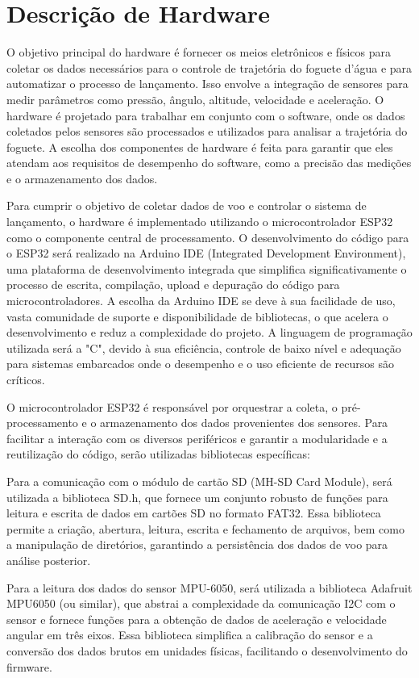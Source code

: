 \section{Descrição de Hardware}
O objetivo principal do hardware é fornecer os meios eletrônicos e físicos para coletar os dados necessários para o controle de trajetória do foguete d'água e para automatizar o processo de lançamento. Isso envolve a integração de sensores para medir parâmetros como pressão, ângulo, altitude, velocidade e aceleração. O hardware é projetado para trabalhar em conjunto com o software, onde os dados coletados pelos sensores são processados e utilizados para analisar a trajetória do foguete. A escolha dos componentes de hardware é feita para garantir que eles atendam aos requisitos de desempenho do software, como a precisão das medições e o armazenamento dos dados.

Para cumprir o objetivo de coletar dados de voo e controlar o sistema de lançamento, o hardware é implementado utilizando o microcontrolador ESP32 como o componente central de processamento. O desenvolvimento do código para o ESP32 será realizado na Arduino IDE (Integrated Development Environment), uma plataforma de desenvolvimento integrada que simplifica significativamente o processo de escrita, compilação, upload e depuração do código para microcontroladores. A escolha da Arduino IDE se deve à sua facilidade de uso, vasta comunidade de suporte e disponibilidade de bibliotecas, o que acelera o desenvolvimento e reduz a complexidade do projeto. A linguagem de programação utilizada será a "C", devido à sua eficiência, controle de baixo nível e adequação para sistemas embarcados onde o desempenho e o uso eficiente de recursos são críticos.

O microcontrolador ESP32 é responsável por orquestrar a coleta, o pré-processamento e o armazenamento dos dados provenientes dos sensores. Para facilitar a interação com os diversos periféricos e garantir a modularidade e a reutilização do código, serão utilizadas bibliotecas específicas:

Para a comunicação com o módulo de cartão SD (MH-SD Card Module), será utilizada a biblioteca SD.h, que fornece um conjunto robusto de funções para leitura e escrita de dados em cartões SD no formato FAT32. Essa biblioteca permite a criação, abertura, leitura, escrita e fechamento de arquivos, bem como a manipulação de diretórios, garantindo a persistência dos dados de voo para análise posterior.

Para a leitura dos dados do sensor MPU-6050, será utilizada a biblioteca Adafruit MPU6050 (ou similar), que abstrai a complexidade da comunicação I2C com o sensor e fornece funções para a obtenção de dados de aceleração e velocidade angular em três eixos. Essa biblioteca simplifica a calibração do sensor e a conversão dos dados brutos em unidades físicas, facilitando o desenvolvimento do firmware.

